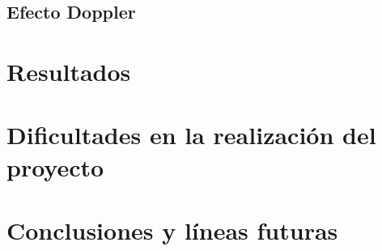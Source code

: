 \documentclass[a4paper,11pt]{article}
\begin{document}
	\subsection{Efecto Doppler}

\section{Resultados}

\section{Dificultades en la realización del proyecto}

\section{Conclusiones y líneas futuras}
 
\end{document}

